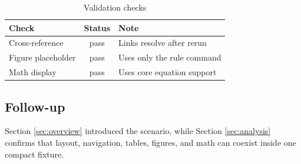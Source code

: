 \documentclass{article}
\begin{document}
\begin{table}[h]
\caption{Validation checks}
\label{tab:checks}
\begin{tabular}{|l|c|l|}
\hline
Check & Status & Note \\
\hline
Cross-reference & pass & Links resolve after rerun \\
Figure placeholder & pass & Uses only the rule command \\
Math display & pass & Uses core equation support \\
\hline
\end{tabular}
\end{table}

\subsection{Follow-up}
Section \ref{sec:overview} introduced the scenario, while Section \ref{sec:analysis} confirms that layout, navigation, tables, figures, and math can coexist inside one compact fixture.
\end{document}
